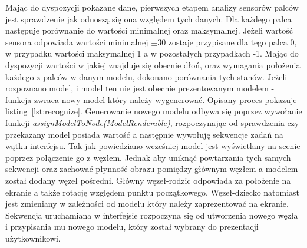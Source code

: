 Mając do dyspozycji pokazane dane, pierwszych etapem analizy sensorów palców jest sprawdzenie jak odnoszą się ona względem tych danych. Dla każdego palca następuje porównanie do wartości minimalnej oraz maksymalnej. Jeżeli wartość sensora odpowiada wartości minimalnej $\pm 30$ zostaje przypisane dla tego palca 0, w przypadku wartości maksymalnej 1 a w pozostałych przypadkach -1. Mając do dyspozycji wartości w jakiej znajduje się obecnie dłoń, oraz wymagania położenia każdego z palców w danym modelu, dokonano porównania tych stanów. Jeżeli rozpoznano model, i model ten nie jest obecnie prezentowanym modelem - funkcja zwraca nowy model który należy wygenerować. Opisany proces pokazuje listing~\ref{lst:recognize}. Generowanie nowego modelu odbywa się poprzez wywołanie funkcji \textit{assignModelToNode(ModelRenderable)}, rozpoczynając od sprawdzenia czy przekazany model posiada wartość a następnie wywołuję sekwencje zadań na wątku interfejsu. Tak jak powiedziano wcześniej model jest wyświetlany na scenie poprzez połączenie go z węzłem. Jednak aby uniknąć powtarzania tych samych sekwencji oraz zachować płynność obrazu pomiędzy głównym węzłem a modelem został dodany węzeł pośredni. Główny węzeł-rodzic odpowiada za położenie na ekranie a także rotację względem punktu początkowego. Węzeł-dziecko natomiast jest zmieniany w zależności od modelu który należy zaprezentować na ekranie. Sekwencja uruchamiana w interfejsie rozpoczyna się od utworzenia nowego węzła i przypisania mu nowego modelu, który został wybrany do prezentacji użytkownikowi.  

